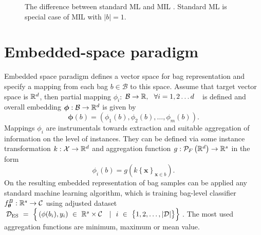 \begin{figure}[h]
	\centering
	\caption{The difference between standard ML and MIL \cite{mandlik}. Standard ML is special case of MIL with $\vert b \vert = 1$. }%
	\label{ggm}%
\end{figure}
\section{Embedded-space paradigm}
Embedded space paradigm \cite{mandlik} defines a vector space for bag representation and specify a mapping from each bag $b\in \mathcal{B}$ to this space. Assume that target vector space is $\mathbb{R}^d$, then partial mapping $\phi_i$: $\mathcal{B} \to \mathbb{R},~~\forall i=1,2\dots d$~~is defined and overall embedding $\boldsymbol{\phi}: \mathcal{B} \to \mathbb{R}^d $ is given by
\begin{equation}
	\boldsymbol{\phi}(b) = \left(\phi_1(b), \phi_2(b), \dots, \phi_m(b)\right).
\end{equation}
Mappings $\phi_i$ are instrumentals towards extraction and suitable aggregation of information on the level of instances. They can be defined via some instance transformation $k:\mathcal{X}\to \mathbb{R}^d$ and aggregation function $g:\mathcal{P}_F\left(\mathbb{R}^d\right) \to \mathbb{R}^s$ in the form 
\begin{equation}
	\phi_i(b)=g\left( k\left\lbrace\boldsymbol{x}\right\rbrace_{\boldsymbol{x} \in b}\right).
\end{equation}
On the resulting embedded representation of bag samples can be applied any standard machine learning algorithm, which is training bag-level classifier $f_{\boldsymbol{\theta}}^B :\mathbb{R}^s \to \mathcal{C}$ using adjusted dataset $\mathcal{D}_{\mathrm{ES}}~=~\Big\lbrace \left(\phi(b_i), y_i\right)~\in~\R^s\times\mathcal{C}~\ ~|~\ i~\in~\big\lbrace 1,2,\dots,\vert\mathcal{D}\vert\big\rbrace\Big\rbrace$. The most used aggregation functions are minimum, maximum or mean value.
